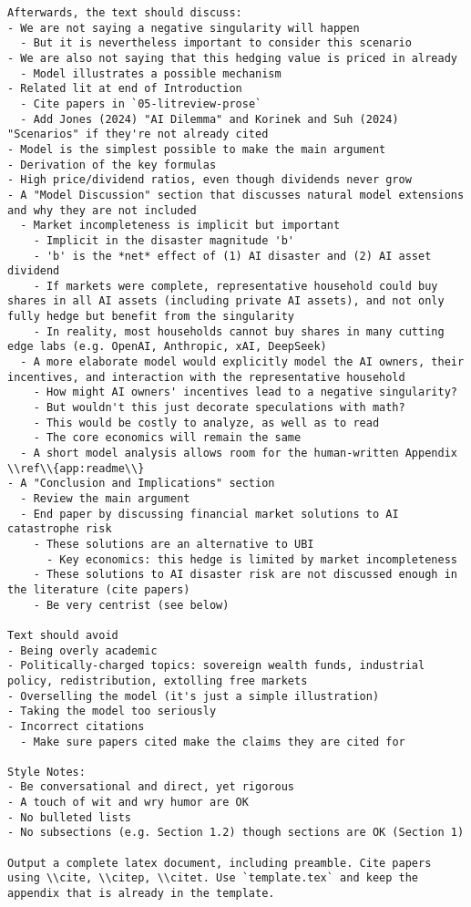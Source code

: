\begin{lstlisting}[language=text,breaklines=true,frame=single]
Afterwards, the text should discuss:      
- We are not saying a negative singularity will happen
  - But it is nevertheless important to consider this scenario        
- We are also not saying that this hedging value is priced in already
  - Model illustrates a possible mechanism
- Related lit at end of Introduction
  - Cite papers in `05-litreview-prose`
  - Add Jones (2024) "AI Dilemma" and Korinek and Suh (2024) "Scenarios" if they're not already cited
- Model is the simplest possible to make the main argument
- Derivation of the key formulas
- High price/dividend ratios, even though dividends never grow
- A "Model Discussion" section that discusses natural model extensions and why they are not included
  - Market incompleteness is implicit but important
    - Implicit in the disaster magnitude 'b'
    - 'b' is the *net* effect of (1) AI disaster and (2) AI asset dividend
    - If markets were complete, representative household could buy shares in all AI assets (including private AI assets), and not only fully hedge but benefit from the singularity 
    - In reality, most households cannot buy shares in many cutting edge labs (e.g. OpenAI, Anthropic, xAI, DeepSeek)
  - A more elaborate model would explicitly model the AI owners, their incentives, and interaction with the representative household
    - How might AI owners' incentives lead to a negative singularity?        
    - But wouldn't this just decorate speculations with math?          
    - This would be costly to analyze, as well as to read
    - The core economics will remain the same 
  - A short model analysis allows room for the human-written Appendix \\ref\\{app:readme\\}
- A "Conclusion and Implications" section 
  - Review the main argument
  - End paper by discussing financial market solutions to AI catastrophe risk
    - These solutions are an alternative to UBI
      - Key economics: this hedge is limited by market incompleteness
    - These solutions to AI disaster risk are not discussed enough in the literature (cite papers)
    - Be very centrist (see below)

Text should avoid      
- Being overly academic
- Politically-charged topics: sovereign wealth funds, industrial policy, redistribution, extolling free markets
- Overselling the model (it's just a simple illustration)
- Taking the model too seriously
- Incorrect citations
  - Make sure papers cited make the claims they are cited for

Style Notes:
- Be conversational and direct, yet rigorous
- A touch of wit and wry humor are OK
- No bulleted lists
- No subsections (e.g. Section 1.2) though sections are OK (Section 1)      

Output a complete latex document, including preamble. Cite papers using \\cite, \\citep, \\citet. Use `template.tex` and keep the appendix that is already in the template.

\end{lstlisting}
\vspace{-3ex}